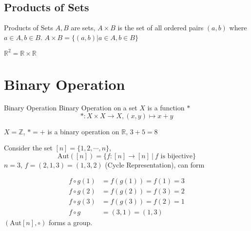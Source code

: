 \subsection{Products of Sets}

\begin{Definition}{Products of Sets}{}
  $A, B$ are sets, $A \times B$ is the set of all ordered pairs $(a, b)$ where $a \in A, b \in B$. $A \times B = \{(a, b) | a \in A, b \in B\}$
\end{Definition}

\begin{Example}{}{}
  $\mathbb{R}^{2} = \mathbb{R} \times \mathbb{R}$ 
\end{Example}

\section{Binary Operation}

\begin{Definition}{Binary Operation}{}
  Binary Operation on a set $X$ is a function $*$
  \[
  *: X \times X \to X, (x, y) \mapsto  x + y
  \]
\end{Definition}

\begin{Example}{}{}
  $X = \mathbb{Z}$, $* = +$ is a binary operation on $\mathbb{R}$, $3 + 5 = 8$
\end{Example}

\begin{Example}{}{}
  Consider the set $[n] = \{1, 2, \cdots, n \}$, 
  \[
  \text{Aut}([n]) = \{f:[n] \rightarrow [n]~|~f \text{ is bijective}\}
  \] 
  $n = 3$, $f = (2, 1, 3) = (1, 3, 2)$ (Cycle Representation), can form
  \begin{figure}[H]
    \centering
  \end{figure}
  \[
  \begin{aligned}
    f \circ g(1) &= f(g(1)) = f(1) = 3 \\
    f \circ g(2) &= f(g(2)) = f(3) = 2 \\
    f \circ g(3) &= f(g(3)) = f(2) = 1 \\
    f \circ g &= (3, 1) = (1, 3)
  \end{aligned}
  \]
  $(\text{Aut}[n], \circ)$ forms a group.
\end{Example}

